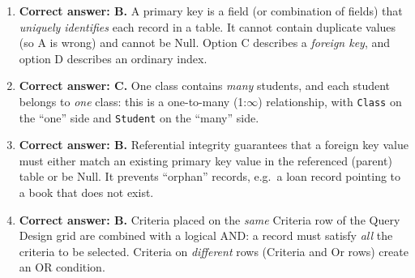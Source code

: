 \documentclass[11pt]{article}
\newcommand{\cle}[1]{{\popxbold\color{popdark}#1}}
\begin{document}
\begin{corrige}
\begin{enumerate}
\item \textbf{Correct answer: B.} A \cle{primary key} is a field (or combination of fields) that \emph{uniquely identifies} each record in a table. It cannot contain duplicate values (so A is wrong) and cannot be Null. Option C describes a \emph{foreign key}, and option D describes an ordinary index.
\item \textbf{Correct answer: C.} One class contains \emph{many} students, and each student belongs to \emph{one} class: this is a \cle{one-to-many} (1:$\infty$) relationship, with \texttt{Class} on the ``one'' side and \texttt{Student} on the ``many'' side.
\item \textbf{Correct answer: B.} \cle{Referential integrity} guarantees that a foreign key value must either match an existing primary key value in the referenced (parent) table or be Null. It prevents ``orphan'' records, e.g.\ a loan record pointing to a book that does not exist.
\item \textbf{Correct answer: B.} Criteria placed on the \emph{same} Criteria row of the Query Design grid are combined with a logical \cle{AND}: a record must satisfy \emph{all} the criteria to be selected. Criteria on \emph{different} rows (Criteria and Or rows) create an OR condition.
\end{enumerate}
\end{corrige}
\end{document}

